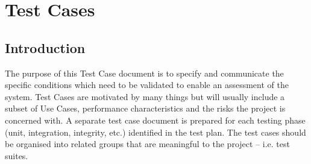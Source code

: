 \section{Test Cases}
\subsection{Introduction}
The purpose of this Test Case document is to specify and communicate the specific
conditions which need to be validated to enable an assessment of the system. Test
Cases are motivated by many things but will usually include a subset of Use Cases,
performance characteristics and the risks the project is concerned with.
A separate test case document is prepared for each testing phase (unit,
integration, integrity, etc.) identified in the test plan. The test cases should be
organised into related groups that are meaningful to the project – i.e. test suites.

